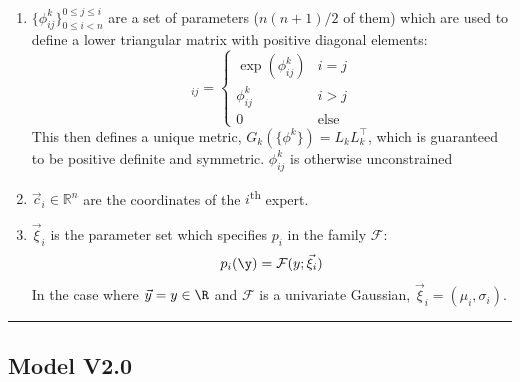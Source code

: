 \begin{table}
\begin{flushleft}
\begin{enumerate}
\begin{enumerate}
						      \item $\{\phi^k_{ij}\}_{0 \leq i < n}^{0 \leq j \leq i}$ are a set of parameters ($n(n+1)/2$ of them) which are used to define a lower triangular matrix with positive diagonal elements:
						            \begin{equation}
							            [L_k]_{ij} = \begin{cases} \exp(\phi^k_{ij}) & i = j \\ \phi^k_{ij} & i > j \\ 0 &\text{else}\end{cases}
						            \end{equation}
						            This then defines a unique metric, $G_k(\{\phi^k\}) = L_k L_k^\intercal$, which is guaranteed to be positive definite and symmetric. $\phi^k_{ij}$ is otherwise unconstrained
						      \item $\vec{c}_i \in \mathbb{R}^n$ are the coordinates of the $i$\textsuperscript{th} expert.
						      \item $\vec{\xi}_i$ is the parameter set which specifies $p_i$ in the family $\mathcal{F}$:
						            \begin{equation}
							            p_i(\y) = \mathcal{F}(y; \vec{\xi}_i)
						            \end{equation}
						            In the case where $\vec{y} = y \in \R$ and $\mathcal{F}$ is a univariate Gaussian, $\vec{\xi}_i = (\mu_i, \sigma_i)$.
					      \end{enumerate}
				\end{enumerate}
			\end{flushleft}
			\hrule
			\caption{The full specification of a \name{} model.}\label{T:fullModel}
		\end{table}
		\newpage
		\def\vxi{\vec{\xi}}
		\def\vXi{\vec{\Xi}}
	\subsection{Model V2.0}

